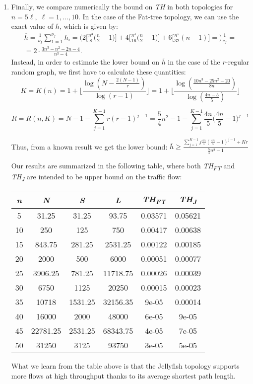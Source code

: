\documentclass[a4paper,12pt]{article}
\begin{document}
\begin{enumerate}
 \item Finally, we compare numerically the bound on \textit{TH} in both topologies for $n =5\ell, \;\ell = 1,\ldots,10$. 
 In the case of the Fat-tree topology, we can use the exact value of $\overline{h}$, which is given by:
 \begin{gather*} 
  \overline{h} = \frac{1}{\nu_f}\sum_{1=1}^{\nu_f}h_i = \bigg (2\bigg[\frac{n^3}{8}\bigg(\frac{n}{2}-1\bigg)\bigg] + 4\bigg[\frac{n^4}{16}\bigg(\frac{n}{2}-1\bigg)\bigg] + 6\bigg[\frac{n^5}{32}(n-1)\bigg] = \bigg )\frac{1}{\nu_f} =\\
  = 2\cdot\frac{3n^3-n^2-2n-4}{n^3-4}.
 \end{gather*}
 Instead, in order to estimate the lower bound on $\overline{h}$ in the case of the $r$-regular random graph, we first have to calculate these quantities:
 $$ K = K(n) = 1+ \bigg\lfloor \frac{\log(N-\frac{2(N-1)}{r})}{\log(r-1)}\bigg\rfloor =
 1+ \bigg\lfloor \frac{\log(\frac{10n^3-25n^2-20}{8n})}{\log(\frac{4n-5}{5})}\bigg\rfloor $$
 
 $$ R = R(n, K) = N-1-\sum_{j=1}^{K-1}r(r-1)^{j-1} = \frac{5}{4}n^2-1-\sum_{j=1}^{K-1}\frac{4n}{5}\bigg(\frac{4n}{5}-1\bigg)^{j-1}$$
 
 Thus, from a known result we get the lower bound: $ \overline{h} \geq \frac{\sum_{j=1}^{K-1}j \frac{4n}{5}(\frac{4n}{5}-1)^{j-1}+Kr}{\frac{5}{4}n^2-1}$
  
 
 Our results are summarized in the following table, where both \textit{ TH\textsubscript{FT}} and \textit{ TH\textsubscript{J}} are intended to be upper bound on the traffic flow:
 \begin{center}
\begin{tabular}{ |c|c|c|c|c|c|} 
 \hline
 \it n & \it N & \it S & \it L & \it TH\textsubscript{FT} & \it TH\textsubscript{J}\\
 \hline
 5 & 31.25 & 31.25 & 93.75 & 0.03571 & 0.05621\\
 10 & 250 & 125 & 750 & 0.00417 & 0.00638\\
 15 & 843.75 & 281.25 & 2531.25 & 0.00122 & 0.00185\\
 20 & 2000 & 500 & 6000 & 0.00051 & 0.00077\\
 25 & 3906.25 & 781.25 & 11718.75 & 0.00026 & 0.00039\\
 30 & 6750 & 1125 & 20250 & 0.00015 & 0.00023\\
 35 & 10718 & 1531.25 & 32156.35 & 9e-05 & 0.00014\\
 40 & 16000 & 2000 & 48000 & 6e-05 & 9e-05\\
 45 & 22781.25 & 2531.25 & 68343.75 & 4e-05 & 7e-05\\
 50 & 31250 & 3125 & 93750 &3e-05 & 5e-05\\
 \hline
\end{tabular}
\end{center}
What we learn from the table above is that the Jellyfish topology supports more flows at high throughput thanks to its average shortest path length.
\end{enumerate}
 
\end{document}
